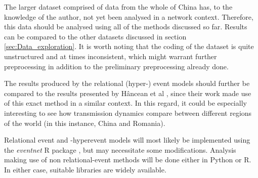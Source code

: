 \documentclass{article}
\begin{document}
	The larger dataset comprised of data from the whole of China has, to the knowledge of the author, not yet been analysed in a network context. Therefore, this data should be analysed using all of the methods discussed so far. Results can be compared to the other datasets discussed in section \ref{sec:Data_exploration}. It is worth noting that the coding of the dataset is quite unstructured and at times inconsistent, which might warrant further preprocessing in addition to the preliminary preprocessing already done.
	
	The results produced by the relational (hyper-) event models should further be compared to the results presented by Hâncean et al \cite{hancean2022occupations}, since their work made use of this exact method in a similar context. In this regard, it could be especially interesting to see how transmission dynamics compare between different regions of the world (in this instance, China and Romania). 
	
	Relational event and -hyperevent models will most likely be implemented using the \emph{eventnet} R package \cite{eventnet}, but may necessitate some modifications. Analysis making use of non relational-event methods will be done either in Python or R. In either case, suitable libraries are widely available.
	
	\printbibliography
\end{document}
